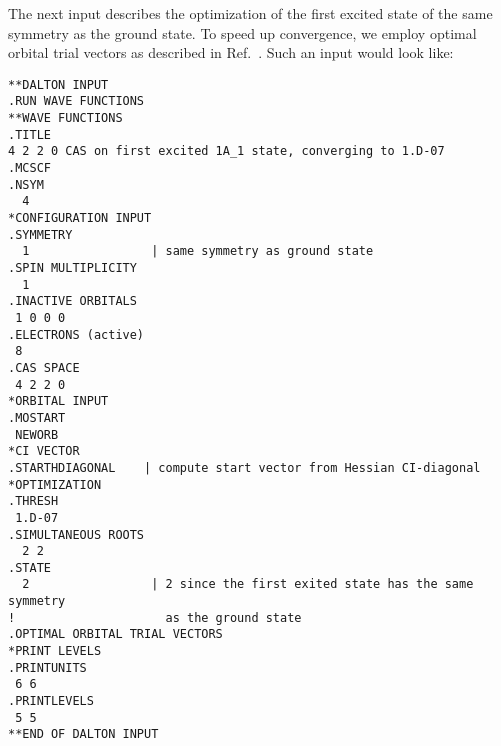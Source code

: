 \begin{center}
\end{center}

The next input describes the optimization of the first excited
state
of the same symmetry as the ground state. To speed up convergence, we
employ optimal orbital trial
vectors as described in
Ref.~\cite{hjajpjhajcp87}. Such an input would look like:

\begin{verbatim}
**DALTON INPUT
.RUN WAVE FUNCTIONS
**WAVE FUNCTIONS
.TITLE
4 2 2 0 CAS on first excited 1A_1 state, converging to 1.D-07
.MCSCF
.NSYM
  4
*CONFIGURATION INPUT
.SYMMETRY
  1                 | same symmetry as ground state
.SPIN MULTIPLICITY
  1
.INACTIVE ORBITALS
 1 0 0 0
.ELECTRONS (active)
 8
.CAS SPACE
 4 2 2 0
*ORBITAL INPUT
.MOSTART
 NEWORB
*CI VECTOR
.STARTHDIAGONAL    | compute start vector from Hessian CI-diagonal
*OPTIMIZATION
.THRESH
 1.D-07
.SIMULTANEOUS ROOTS
  2 2
.STATE
  2                 | 2 since the first exited state has the same symmetry
!                     as the ground state
.OPTIMAL ORBITAL TRIAL VECTORS
*PRINT LEVELS
.PRINTUNITS
 6 6
.PRINTLEVELS
 5 5
**END OF DALTON INPUT
\end{verbatim}
\label{sirius_ex5}

\begin{center}
\end{center}

